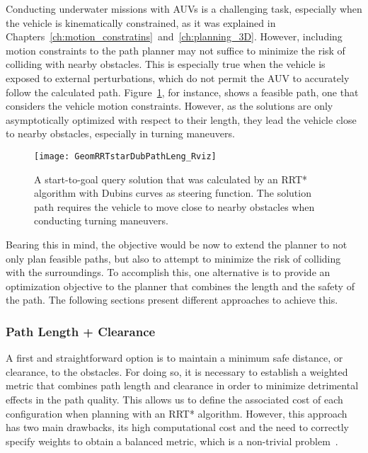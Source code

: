 Conducting underwater missions with \acp{AUV} is a challenging task, especially
when the vehicle is kinematically constrained, as it was explained in
Chapters~\ref{ch:motion_constratins}~and~\ref{ch:planning_3D}. However,
including motion constraints to the path planner may not suffice to
minimize the risk of colliding with nearby obstacles. This is especially true
when the vehicle is exposed to external perturbations, which do not permit the
\ac{AUV} to accurately follow the calculated path.
Figure~\ref{fig:GeomRRTstarDubPathLeng_Rviz}, for instance, shows a feasible
path, \ie one that considers the vehicle motion constraints. However, as the
solutions are only asymptotically optimized with respect to their length, they
lead the vehicle close to nearby obstacles, especially in turning maneuvers.

\begin{figure}[htbp]
	\centering
	\texttt{[image: GeomRRTstarDubPathLeng\_Rviz]}
\caption[A start-to-goal query solution using an RRT* algorithm with Dubins
curves.]
{A start-to-goal query solution that was calculated by an \ac{RRT*} algorithm
with Dubins curves as steering function. The solution path requires the vehicle
to move close to nearby obstacles when conducting turning maneuvers.}
\label{fig:GeomRRTstarDubPathLeng_Rviz}
\end{figure}

Bearing this in mind, the objective would be now to extend the planner to not
only plan feasible paths, but also to attempt to minimize the risk of colliding
with the surroundings. To accomplish this, one alternative is to provide an
optimization objective to the planner that combines the length and the safety
of the path. The following sections present different approaches to achieve
this.

\subsubsection{Path Length + Clearance}

A first and straightforward option is to maintain a minimum safe distance, or
clearance, to the obstacles. For doing so, it is necessary to establish a
weighted metric that combines path length and clearance in order to minimize
detrimental effects in the path quality. This allows us to define the associated
cost of each configuration when planning with an \ac{RRT*} algorithm. However,
this approach has two main drawbacks, its high computational cost and the need to
correctly specify weights to obtain a balanced metric, which is a non-trivial
problem~\cite{Tsianos2007}.

